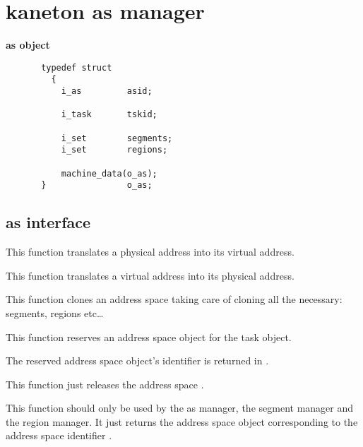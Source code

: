 \section{kaneton as manager}

{\large {\bf as object}}

\begin{verbatim}
       typedef struct
         {
           i_as         asid;

           i_task       tskid;

           i_set        segments;
           i_set        regions;

           machine_data(o_as);
       }                o_as;
\end{verbatim}

\subsection*{as interface}

	 {
	   This function translates a physical address into its virtual
	   address.
	 }

	 {
	   This function translates a virtual address into its physical
	   address.
	 }

	 {
	   This function clones an address space taking care of cloning
	   all the necessary: segments, regions etc\ldots
	 }

	 {
	   This function reserves an address space object for the
	   task  object.

	   The reserved address space object's identifier is returned
	   in .
	 }

	 {
	   This function just releases the address space .
	 }

	 {
	   This function should only be used by the as manager, the segment
	   manager and the region manager. It just returns the address space
	   object corresponding to the address space identifier .
	 }



